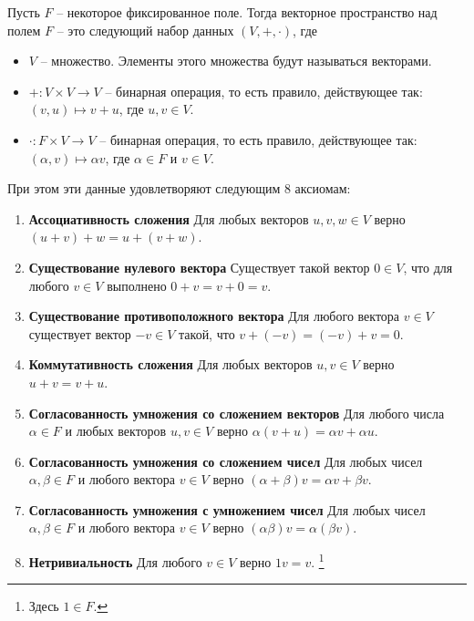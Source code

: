 \begin{definition}
\label{def::VectorSpace}
Пусть $F$ -- некоторое фиксированное поле.
Тогда векторное пространство над полем $F$ -- это следующий набор данных $(V, +, \cdot)$, где
\begin{itemize}
\item $V$ -- множество.
Элементы этого множества будут называться векторами.

\item $+\colon V \times V \to V$ -- бинарная операция, то есть правило, действующее так: $(v,u)\mapsto v + u$, где $u,v \in V$.

\item $\cdot \colon F \times V \to V$ -- бинарная операция, то есть правило, действующее так: $(\alpha, v)\mapsto \alpha v$, где $\alpha \in F$ и $v\in V$.
\end{itemize}
При этом эти данные удовлетворяют следующим $8$ аксиомам:
\begin{enumerate}
\item {\bf Ассоциативность сложения} Для любых векторов $u,v,w\in V$ верно $(u+v) + w = u + (v+w)$.

\item {\bf Существование нулевого вектора} Существует такой вектор $0\in V$, что для любого $v\in V$ выполнено $0 + v = v + 0 = v$.

\item {\bf Существование противоположного вектора} Для любого вектора $v\in V$ существует вектор $-v\in V$ такой, что $v + (-v) = (-v) + v = 0$.

\item {\bf Коммутативность сложения} Для любых векторов $u,v \in V$ верно $u + v = v + u$.

\item {\bf Согласованность умножения со сложением векторов} Для любого числа $\alpha \in F$ и любых векторов $u,v \in V$ верно $\alpha(v + u) = \alpha v + \alpha u$.

\item {\bf Согласованность умножения со сложением чисел} Для любых чисел $\alpha, \beta\in F$ и любого вектора $v\in V$ верно $(\alpha + \beta)v = \alpha v + \beta v$.

\item {\bf Согласованность умножения с умножением чисел} Для любых чисел $\alpha,\beta\in F$ и любого вектора $v\in V$ верно $(\alpha\beta)v = \alpha(\beta v)$.

\item {\bf Нетривиальность} Для любого $v\in V$ верно $1 v = v$.%
\footnote{Здесь $1\in F$.}
\end{enumerate}
\end{definition}

